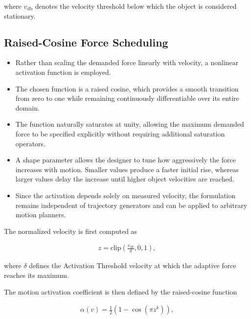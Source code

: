 \documentclass[conference]{IEEEtran}
\begin{document}
where $v_{\mathrm{db}}$ denotes the velocity threshold below which the object is considered stationary.


\subsection{Raised-Cosine Force Scheduling}

\begin{itemize}

    \item Rather than scaling the demanded force linearly with velocity, a nonlinear activation function is employed.

    \item The chosen function is a raised cosine, which provides a smooth transition from zero to one while remaining continuously differentiable over its entire domain.

    \item The function naturally saturates at unity, allowing the maximum demanded force to be specified explicitly without requiring additional saturation operators.

    \item A shape parameter allows the designer to tune how aggressively the force increases with motion. Smaller values produce a faster initial rise, whereas larger values delay the increase until higher object velocities are reached.

    \item Since the activation depends solely on measured velocity, the formulation remains independent of trajectory generators and can be applied to arbitrary motion planners.
\end{itemize}

The normalized velocity is first computed as

\begin{align}
z
=
\mathrm{clip}
\left(
\frac{v_{\mathrm{eff}}}{\delta},
0,
1
\right),
\end{align}

where $\delta$ defines the Activation Threshold velocity at which the adaptive force reaches its maximum.

The motion activation coefficient is then defined by the raised-cosine function

\begin{align}
\alpha(v)
=
\frac{1}{2}
\left(
1-
\cos
\left(
\pi z^k
\right)
\right),
\end{align}
\end{document}
